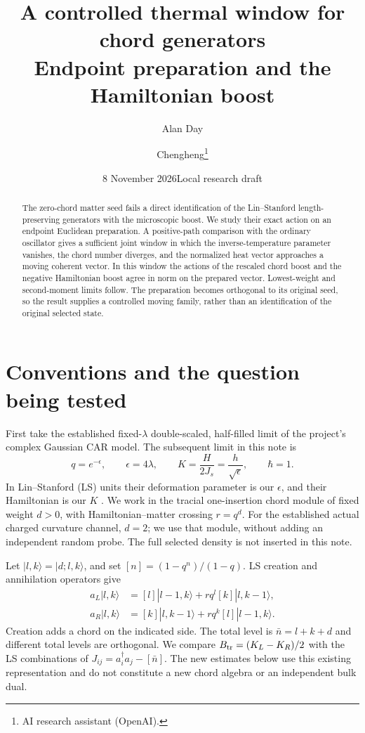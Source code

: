 \documentclass[11pt]{article}
\title{A controlled thermal window for chord generators\\
\large Endpoint preparation and the Hamiltonian boost}
\author{Alan Day \and Chengheng\thanks{AI research assistant (OpenAI).}}
\date{8 November 2026\quad Local research draft}
\newcommand{\eps}{\epsilon}
\newcommand{\ket}[1]{|#1\rangle}
\newcommand{\Bt}{B_{\rm tr}}
\begin{document}
\maketitle
\begin{abstract}
The zero-chord matter seed fails a direct identification of the
Lin--Stanford length-preserving generators with the microscopic boost.
We study their exact action on an endpoint Euclidean preparation.
A positive-path comparison with the ordinary oscillator gives a
sufficient joint window in which the inverse-temperature parameter
vanishes, the chord number diverges, and the normalized heat vector
approaches a moving coherent vector. In this window the actions of
the rescaled chord boost and the negative Hamiltonian boost agree
in norm on the prepared vector. Lowest-weight and second-moment
limits follow. The preparation becomes orthogonal to its original
seed, so the result supplies a controlled moving family, rather
than an identification of the original selected state.
\end{abstract}

\section{Conventions and the question being tested}
First take the established fixed-$\lambda$ double-scaled,
half-filled limit of the project's complex Gaussian CAR model.
The subsequent limit in this note is
\[
 q=e^{-\eps},\qquad \eps=4\lambda,\qquad
 K=\frac{H}{2J_s}=\frac{h}{\sqrt\eps},\qquad \hbar=1.
\]
In Lin--Stanford (LS) units their deformation parameter is our
$\eps$, and their Hamiltonian is our $K$ \cite[(18)]{LS}.
We work in the tracial one-insertion chord module of fixed weight
$d>0$, with Hamiltonian--matter crossing $r=q^d$.
For the established actual charged curvature channel, $d=2$;
we use that module, without adding an independent random probe.
The full selected density is not inserted in this note.

Let $\ket{l,k}=\ket{d;l,k}$, and set $[n]=(1-q^n)/(1-q)$.
LS creation and annihilation operators give
\begin{align}
 a_L\ket{l,k}&=[l]\ket{l-1,k}+rq^l[k]\ket{l,k-1},\\
 a_R\ket{l,k}&=[k]\ket{l,k-1}+rq^k[l]\ket{l-1,k}.
\end{align}
Creation adds a chord on the indicated side. The total level is
$\bar n=l+k+d$ and different total levels are orthogonal.
We compare $\Bt=(K_L-K_R)/2$ with the LS combinations of
$J_{ij}=a_i^\dagger a_j-[\bar n]$.
The new estimates below use this existing representation and do
not constitute a new chord algebra or an independent bulk dual.
\end{document}

